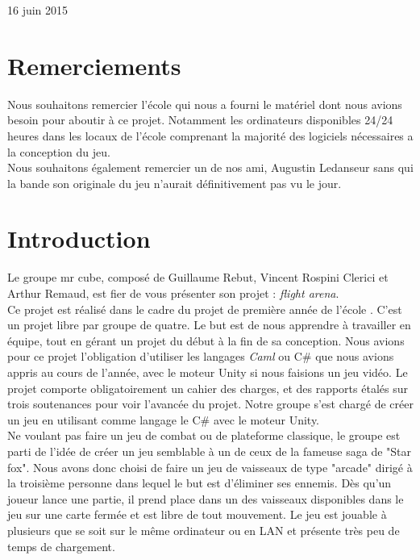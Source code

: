 \documentclass[12pt, titlepage]{article}
\begin{document}
\begin{spacing}{1.5}
\begin{titlepage}
\begin{center}
\vfill{16 juin 2015}
\end{center}
\end{titlepage}

\section*{Remerciements}
Nous souhaitons remercier l'école  qui nous a fourni le matériel dont nous avions besoin pour aboutir à ce projet. Notamment les ordinateurs disponibles 24/24 heures dans les locaux de l'école comprenant la majorité des logiciels nécessaires a la conception du jeu.\\

Nous souhaitons également remercier un de nos ami, Augustin Ledanseur sans qui la bande son originale du jeu n'aurait définitivement pas vu le jour. \\

\newpage

\renewcommand{\contentsname}{Sommaire}
\renewcommand{\chaptername}{Partie}

\tableofcontents
{}


\newpage
\section*{Introduction}
Le groupe mr cube, composé de Guillaume Rebut, Vincent Rospini Clerici et Arthur Remaud, est fier de vous présenter son projet : \textit{flight arena}.\\

Ce projet est réalisé dans le cadre  du projet de première année de l'école . C’est un projet libre par groupe de quatre. Le but est de nous apprendre à travailler en équipe, tout en gérant un projet du début à la fin de sa conception. Nous avions pour ce projet l'obligation d'utiliser les langages \textit{Caml} ou {C\#} que nous avions appris au cours de l'année, avec le moteur Unity si nous faisions un jeu vidéo. Le projet comporte obligatoirement un cahier des charges, et des rapports étalés sur trois soutenances pour voir l'avancée du projet. Notre groupe s'est chargé de créer un jeu en utilisant comme langage le C\# avec le moteur Unity.\\

Ne voulant pas faire un jeu de combat ou de plateforme classique, le groupe est parti de l'idée de créer un jeu semblable à un de ceux de la fameuse saga de "Star fox". Nous avons donc choisi de faire un jeu de vaisseaux de type "arcade" dirigé à la troisième personne dans lequel le but est d'éliminer ses ennemis. Dès qu'un joueur lance une partie, il prend place dans un des vaisseaux disponibles dans le jeu sur une carte fermée et est libre de tout mouvement. Le jeu est jouable à plusieurs que se soit sur le même ordinateur ou en LAN et présente très peu de temps de chargement.\\


\end{spacing}
\end{document}
